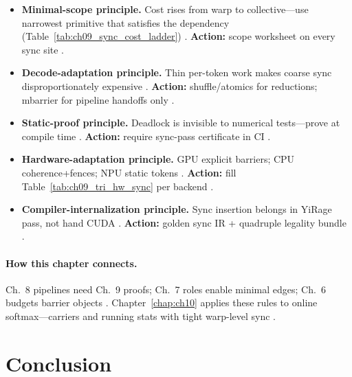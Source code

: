 \begin{itemize}
\item \textbf{Minimal-scope principle.}
Cost rises from warp to collective---use narrowest primitive that satisfies the dependency (Table~\ref{tab:ch09_sync_cost_ladder}) \citep{shah2024flashattention3,patel2025llminference}.
\textbf{Action:} scope worksheet on every sync site \citep{yirage2026,chen2020compilerbasedhardw}.

\item \textbf{Decode-adaptation principle.}
Thin per-token work makes coarse sync disproportionately expensive \citep{taxbreak2026,memoryfloor2026,kwon2023vllm}.
\textbf{Action:} shuffle/atomics for reductions; mbarrier for pipeline handoffs only \citep{dao2022flashattention,semianalysis2024tma}.

\item \textbf{Static-proof principle.}
Deadlock is invisible to numerical tests---prove at compile time \citep{shah2024flashattention3,wu2024mirage,yirage2026}.
\textbf{Action:} require sync-pass certificate in CI \citep{chen2020compilerbasedhardw,mpk2025}.

\item \textbf{Hardware-adaptation principle.}
GPU explicit barriers; CPU coherence+fences; NPU static tokens \citep{nvidia2022hopper,dlbook,amd2024xdna,amd2024aie}.
\textbf{Action:} fill Table~\ref{tab:ch09_tri_hw_sync} per backend \citep{patel2025llminference,yirage2026}.

\item \textbf{Compiler-internalization principle.}
Sync insertion belongs in YiRage pass, not hand CUDA \citep{yirage2026,wu2024mirage,shah2024flashattention3,mpk2025}.
\textbf{Action:} golden sync IR + quadruple legality bundle \citep{chen2020compilerbasedhardw,taxbreak2026}.
\end{itemize}

\paragraph{How this chapter connects.}
Ch.~8 pipelines need Ch.~9 proofs; Ch.~7 roles enable minimal edges; Ch.~6 budgets barrier objects \citep{semianalysis2024tma,shah2024flashattention3,dao2022flashattention,yirage2026}.
Chapter~\ref{chap:ch10} applies these rules to online softmax---carriers and running stats with tight warp-level sync \citep{dao2022flashattention,memoryfloor2026,patel2025llminference}.

\section{Conclusion}
\label{sec:ch09_conclusion}

